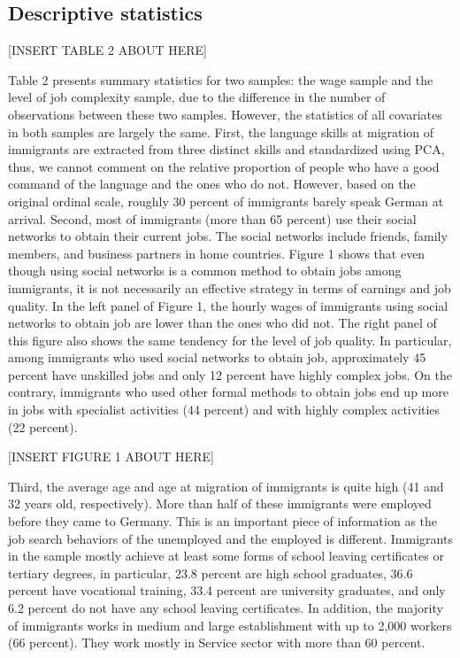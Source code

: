 \documentclass[12pt,a4paper]{article}
\begin{document}
\subsection{Descriptive statistics}

\begin{center}
[INSERT TABLE 2 ABOUT HERE]
\end{center}

Table 2 presents summary statistics for two samples: the wage sample and the level of job complexity sample, due to the difference in the number of observations between these two samples. However, the statistics of all covariates in both samples are largely the same.  First, the language skills at migration of immigrants are extracted from three distinct skills and standardized using PCA, thus, we cannot comment on the relative proportion of people who have a good command of the language and the ones who do not. However, based on the original ordinal scale, roughly 30 percent of immigrants barely speak German at arrival. Second, most of immigrants (more than 65 percent) use their social networks to obtain their current jobs. The social networks include friends, family members, and business partners in home countries. Figure 1 shows that even though using social networks is a common method to obtain jobs among immigrants, it is not necessarily an effective strategy in terms of earnings and job quality. In the left panel of Figure 1, the hourly wages of immigrants using social networks to obtain job are lower than the ones who did not. The right panel of this figure also shows the same tendency for the level of job quality. In particular, among immigrants who used social networks to obtain job, approximately 45 percent have unskilled jobs and only 12 percent have highly complex jobs. On the contrary, immigrants who used other formal methods to obtain jobs end up more in jobs with specialist activities (44 percent) and with highly complex activities (22 percent).

\begin{center}
[INSERT FIGURE 1 ABOUT HERE]
\end{center}

Third, the average age and age at migration of immigrants is quite high (41 and 32 years old, respectively). More than half of these immigrants were employed before they came to Germany. This is an important piece of information as the job search behaviors of the unemployed and the employed is different. Immigrants in the sample mostly achieve at least some forms of school leaving certificates or tertiary degrees, in particular, 23.8 percent are high school graduates, 36.6 percent have vocational training, 33.4 percent are university graduates, and only 6.2 percent do not have any school leaving certificates. In addition, the majority of immigrants works in medium and large establishment with up to 2,000 workers (66 percent). They work mostly in Service sector with more than 60 percent. 
\end{document}
